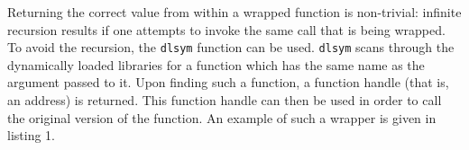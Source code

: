 Returning the correct value from within a wrapped function is non-trivial: infinite recursion results if one attempts to invoke the same call that is being wrapped. To avoid the recursion, the \texttt{dlsym} function can be used. \texttt{dlsym} scans through the dynamically loaded libraries for a function which has the same name as the argument passed to it. Upon finding such a function, a function handle (that is, an address) is returned. This function handle can then be used in order to call the original version of the function. An example of such a wrapper is given in listing 1.

\begin{minipage}{\linewidth} %
	
\end{minipage}


